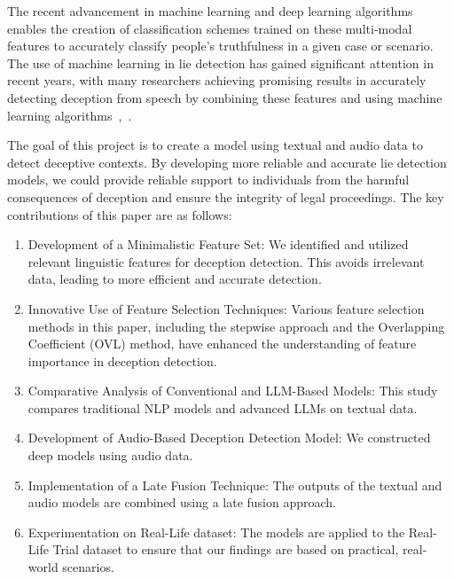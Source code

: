 \documentclass[12pt]{article}
\begin{document}
The recent advancement in machine learning and deep learning algorithms enables the creation of classification schemes trained on these multi-modal features to accurately classify people's truthfulness in a given case or scenario. The use of machine learning in lie detection has gained significant attention in recent years, with many researchers achieving promising results in accurately detecting deception from speech by combining these features and using machine learning algorithms~\cite{talaat2023explainable},~\cite{aslan2023lstmncp}.

  
The goal of this project is to create a model using textual and audio data to detect deceptive contexts.
By developing more reliable and accurate lie detection models, we could provide reliable support to individuals from the harmful consequences of deception and ensure the integrity of legal proceedings. The key contributions of this paper are as follows:

\begin{enumerate}
\item Development of a Minimalistic Feature Set: We identified and utilized relevant linguistic features for deception detection. This avoids irrelevant data, leading to more efficient and accurate detection.

\item Innovative Use of Feature Selection Techniques: Various feature selection methods in this paper, including the stepwise approach and the Overlapping Coefficient (OVL) method, have enhanced the understanding of feature importance in deception detection.

\item Comparative Analysis of Conventional and LLM-Based Models: This study compares traditional NLP models and advanced LLMs on textual data.

\item Development of Audio-Based Deception Detection Model: We constructed deep models using audio data.

\item Implementation of a Late Fusion Technique: The outputs of the textual and audio models are combined using a late fusion approach. 

\item  Experimentation on Real-Life dataset: The models are applied to the Real-Life Trial dataset to ensure that our findings are based on practical, real-world scenarios.

\end{enumerate}
\end{document}
